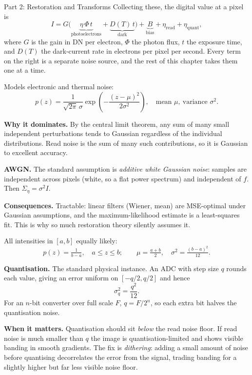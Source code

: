 \documentclass[letterpaper]{article}
\begin{document}
\begin{notes}{Part 2: Restoration and Transforms}
Collecting these, the digital value at a pixel is
$$I = G\bigl(\underbrace{\eta\,\Phi\,t}_{\text{photoelectrons}} + \underbrace{D(T)\,t}_{\text{dark}}\bigr) + \underbrace{B}_{\text{bias}} + \eta_{\text{read}} + \eta_{\text{quant}},$$
where $G$ is the gain in DN per electron, $\Phi$ the photon flux, $t$ the exposure time, and $D(T)$ the dark-current rate in electrons per pixel per second. Every term on the right is a separate noise source, and the rest of this chapter takes them one at a time.


Models electronic and thermal noise:
$$p(z) = \frac{1}{\sqrt{2\pi}\,\sigma}\exp\!\left(-\frac{(z-\mu)^2}{2\sigma^2}\right), \quad \text{mean } \mu,\ \text{variance } \sigma^2.$$

\textbf{Why it dominates.} By the central limit theorem, any sum of many small independent perturbations tends to Gaussian regardless of the individual distributions. Read noise is the sum of many such contributions, so it is Gaussian to excellent accuracy.

\textbf{AWGN.} The standard assumption is \emph{additive white Gaussian noise}: samples are independent across pixels (white, so a flat power spectrum) and independent of $f$. Then $\Sigma_\eta=\sigma^2 I$.

\textbf{Consequences.} Tractable: linear filters (Wiener, mean) are MSE-optimal under Gaussian assumptions, and the maximum-likelihood estimate is a least-squares fit. This is why so much restoration theory silently assumes it.


All intensities in $[a,b]$ equally likely:
$$p(z)=\tfrac{1}{b-a},\quad a\le z\le b; \qquad \mu=\tfrac{a+b}{2},\quad \sigma^2=\tfrac{(b-a)^2}{12}.$$

\textbf{Quantisation.} The standard physical instance. An ADC with step size $q$ rounds each value, giving an error uniform on $[-q/2, q/2]$ and hence
$$\sigma_q^2 = \frac{q^2}{12}.$$
For an $n$-bit converter over full scale $F$, $q = F/2^n$, so each extra bit halves the quantisation noise.

\textbf{When it matters.} Quantisation should sit \emph{below} the read noise floor. If read noise is much smaller than $q$ the image is quantisation-limited and shows visible banding in smooth gradients. The fix is \emph{dithering}: adding a small amount of noise before quantising decorrelates the error from the signal, trading banding for a slightly higher but far less visible noise floor.


\end{notes}
\end{document}
